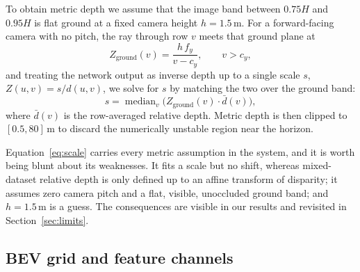 \documentclass[sigconf]{acmart}
\begin{document}
To obtain metric depth we assume that the image band between $0.75H$ and $0.95H$ is flat ground at a fixed camera height $h = 1.5$\,m. For a forward-facing camera with no pitch, the ray through row $v$ meets that ground plane at
\begin{equation}
Z_{\text{ground}}(v) = \frac{h\,f_y}{v - c_y}, \qquad v > c_y,
\end{equation}
and treating the network output as inverse depth up to a single scale $s$, $Z(u,v) = s/d(u,v)$, we solve for $s$ by matching the two over the ground band:
\begin{equation}\label{eq:scale}
s = \operatorname{median}_v \big( Z_{\text{ground}}(v)\cdot \bar{d}(v) \big),
\end{equation}
where $\bar{d}(v)$ is the row-averaged relative depth. Metric depth is then clipped to $[0.5, 80]$\,m to discard the numerically unstable region near the horizon.

Equation~\eqref{eq:scale} carries every metric assumption in the system, and it is worth being blunt about its weaknesses. It fits a scale but no shift, whereas mixed-dataset relative depth is only defined up to an affine transform of disparity; it assumes zero camera pitch and a flat, visible, unoccluded ground band; and $h = 1.5$\,m is a guess. The consequences are visible in our results and revisited in Section~\ref{sec:limits}.

\subsection{BEV grid and feature channels}\label{sec:grid}
\end{document}
